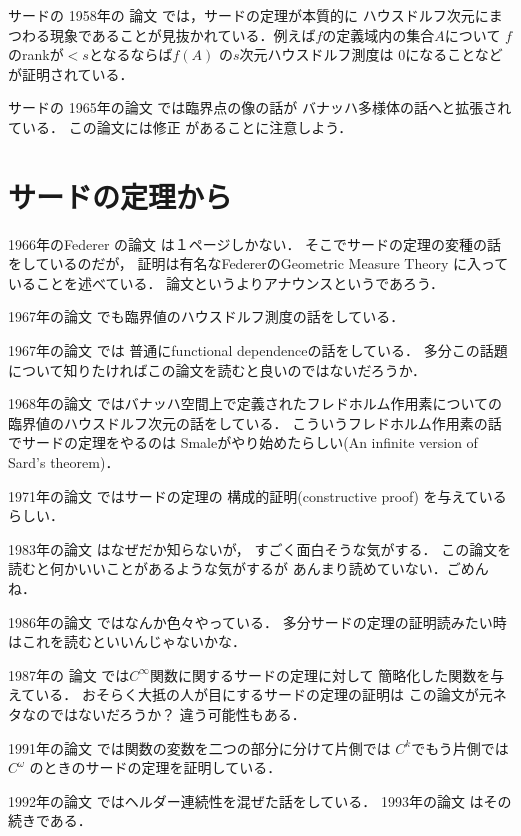\documentclass[leqno, a4paper, 12pt]{jsarticle}
\begin{document}
サードの
1958年の
論文
\cite{MR0100063}
では，サードの定理が本質的に
ハウスドルフ次元にまつわる現象であることが見抜かれている．例えば$f$の定義域内の集合$A$について
$f$のrankが$<s$となるならば$f(A)$
の$s$次元ハウスドルフ測度は
$0$になることなどが証明されている．

サードの
1965年の論文
\cite{MR0173748}
では臨界点の像の話が
バナッハ多様体の話へと拡張されている．
この論文には修正
\cite{MR0180649}
があることに注意しよう．

\section{サードの定理から}

1966年のFederer の論文
\cite{MR0196033}
は１ページしかない．
そこでサードの定理の変種の話をしているのだが，
証明は有名なFedererのGeometric Measure Theory
に入っていることを述べている．
論文というよりアナウンスというであろう．

1967年の論文
\cite{dubovitskii1967sets}
でも臨界値のハウスドルフ測度の話をしている．

1967年の論文
\cite{MR0220884}
では
普通にfunctional dependenceの話をしている．
多分この話題について知りたければこの論文を読むと良いのではないだろうか．


1968年の論文
\cite{pohovzaev1968set}
ではバナッハ空間上で定義されたフレドホルム作用素についての臨界値のハウスドルフ次元の話をしている．
こういうフレドホルム作用素の話でサードの定理をやるのは
Smaleがやり始めたらしい(An infinite version of Sard's theorem)．


1971年の論文
\cite{MR0276988}
ではサードの定理の
構成的証明(constructive proof)
を与えているらしい．

1983年の論文
\cite{MR0716263}
はなぜだか知らないが，
すごく面白そうな気がする．
この論文を読むと何かいいことがあるような気がするが
あんまり読めていない．ごめんね．

1986年の論文
\cite{MR0837817}
ではなんか色々やっている．
多分サードの定理の証明読みたい時はこれを読むといいんじゃないかな．

1987年の
論文
\cite{MR0925986}
では$C^{\infty}$関数に関するサードの定理に対して
簡略化した関数を与えている．
おそらく大抵の人が目にするサードの定理の証明は
この論文が元ネタなのではないだろうか？
違う可能性もある．


1991年の論文
\cite{MR1142720}
では関数の変数を二つの部分に分けて片側では
$C^{k}$でもう片側では
$C^{\omega}$
のときのサードの定理を証明している．


1992年の論文
\cite{MR1074748}
ではヘルダー連続性を混ぜた話をしている．
1993年の論文
\cite{MR1194950}
はその続きである．
\end{document}
